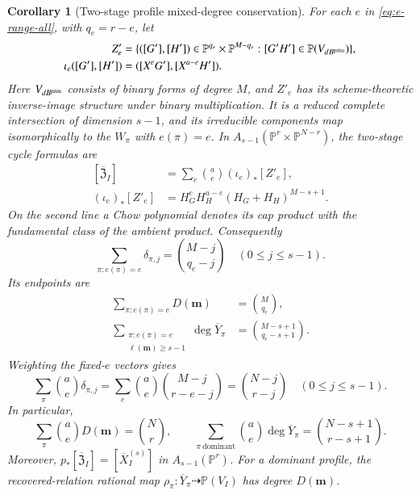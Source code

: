 \documentclass[10pt,fleqn]{article}
\numberwithin{equation}{section}
\newtheorem{corollary}[theorem]{Corollary}
\newcommand{\PP}{\mathbb P}
\begin{document}
\begin{corollary}[Two-stage profile mixed-degree conservation]
For each $e$ in \eqref{eq:e-range-all}, with $q_e=r-e$, let
\begin{equation}\label{eq:fixed-e-incidence}
 \begin{aligned}
 Z'_e&=\{([G'],[H'])\in\PP^{q_e}\times\PP^{M-q_e}:
                [G'H']\in\PP(V_{dB^{\rm prim}})\},\\
 \iota_e([G'],[H'])&=([X^eG'],[X^{a-e}H']).
 \end{aligned}
\end{equation}
Here $V_{dB^{\rm prim}}$ consists of binary forms of degree $M$, and
$Z'_e$ has its scheme-theoretic inverse-image structure under binary
multiplication.  It is a reduced complete intersection of dimension
$s-1$, and its irreducible components map isomorphically to the
$W_\pi$ with $e(\pi)=e$.  In
$A_{s-1}(\PP^r\times\PP^{N-r})$, the two-stage cycle formulas are
\begin{equation}\label{eq:fixed-e-cycle-decomposition}
 \begin{aligned}
 [\overline{\mathfrak Z}_I]
   &=\sum_e\binom ae(\iota_e)_*[Z'_e],\\
 (\iota_e)_*[Z'_e]
   &=H_G^eH_H^{a-e}(H_G+H_H)^{M-s+1}.
 \end{aligned}
\end{equation}
On the second line a Chow polynomial denotes its cap product with the
fundamental class of the ambient product.  Consequently
\begin{equation}\label{eq:fixed-e-multidegree-conservation}
 \boxed{\displaystyle
 \sum_{\pi:e(\pi)=e}\delta_{\pi,j}
     =\binom{M-j}{q_e-j}\quad(0\le j\le s-1).}
\end{equation}
Its endpoints are
\begin{equation}\label{eq:fixed-e-endpoint-conservation}
 \begin{aligned}
 \sum_{\pi:e(\pi)=e}D(\boldsymbol m)&=\binom M{q_e},\\
 \sum_{\substack{\pi:e(\pi)=e\\\ell(\boldsymbol m)\ge s-1}}
                  \deg\overline Y_\pi
     &=\binom{M-s+1}{q_e-s+1}.
 \end{aligned}
\end{equation}
Weighting the fixed-$e$ vectors gives
\begin{equation}\label{eq:profile-multidegree-conservation}
 \boxed{\displaystyle\sum_\pi\binom ae\delta_{\pi,j}
 =\sum_e\binom ae\binom{M-j}{r-e-j}
 =\binom{N-j}{r-j}\quad(0\le j\le s-1).}
\end{equation}
In particular,
\begin{equation}\label{eq:profile-endpoint-conservation}
 \sum_\pi\binom ae D(\boldsymbol m)=\binom Nr,
 \qquad
 \sum_{\pi\ \mathrm{dominant}}\binom ae\deg\overline Y_\pi
 =\binom{N-s+1}{r-s+1}.
\end{equation}
Moreover,
$p_*[\overline{\mathfrak Z}_I]=[\overline X_I^{(s)}]$
in $A_{s-1}(\PP^r)$.  For a dominant profile, the recovered-relation
rational map $\rho_\pi:\overline Y_\pi\dashrightarrow\PP(V_I)$ has
degree $D(\boldsymbol m)$.
\end{corollary}
\end{document}
